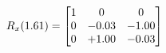 \documentclass[preview]{standalone}
\begin{document}
\begin{align*}
\special{dvisvgm:raw <g id='unique000'>}R_{x}(1.61) = \begin{bmatrix}1 & 0 & 0 \\0 & -0.03 & -1.00 \\0 & +1.00 & -0.03\end{bmatrix}\special{dvisvgm:raw </g>}
\end{align*}
\end{document}
